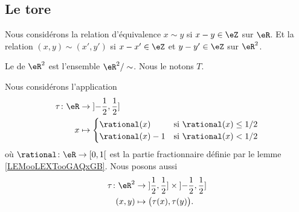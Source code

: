 \subsection{Le tore}


\begin{definition}	\label{DEFooRWLLooHkdFDN}
	Nous considérons la relation d'équivalence \( x\sim y\) si \( x-y\in \eZ\) sur \( \eR\). Et la relation \( (x,y)\sim(x',y')\) si \( x-x'\in \eZ\) et \( y-y'\in \eZ\) sur \( \eR^2\).
\end{definition}


\begin{definition}	\label{DEFooTSSTooOFPxzu}
	Le  de \( \eR^2\) est l'ensemble \( \eR^2/\sim\). Nous le notons \( T\).
\end{definition}

Nous considérons l'application
\begin{equation}
	\begin{aligned}
		\tau\colon \eR & \to \mathopen] -\frac{ 1 }{2},\frac{ 1 }{2}\mathclose]   \\
		x              & \mapsto \begin{cases}
			                         \rational(x)   & \text{si } \rational(x)\leq 1/2 \\
			                         \rational(x)-1 & \text{si }\rational(x)<1/2
		                         \end{cases}
	\end{aligned}
\end{equation}
où \(\rational \colon \eR\to \mathopen[ 0,1\mathclose[  \) est la partie fractionnaire définie par le lemme \ref{LEMooLEXTooGAQxGB}. Nous posons aussi
\begin{equation}
	\begin{aligned}
		\tau\colon \eR^2 & \to \mathopen] \frac{ 1 }{2},\frac{ 1 }{2}\mathclose]\times \mathopen] -\frac{ 1 }{2},\frac{ 1 }{2}\mathclose] \\
		(x,y)            & \mapsto    \big( \tau(x),\tau(y) \big).
	\end{aligned}
\end{equation}

